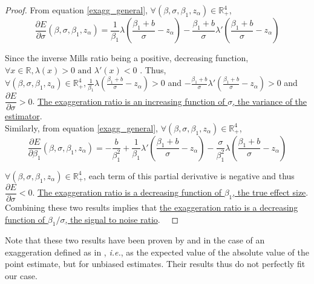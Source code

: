 \documentclass[a4paper, 11pt]{report}
\begin{document}
			\begin{proof}
				From equation \ref{exagg_general}, $\forall (\beta, \sigma, \beta_{1}, z_{\alpha}) \in \mathbb{R}_{+}^{4}$,
				~				
					\[
						\dfrac{\partial E}{\partial \sigma}(\beta, \sigma, \beta_{1}, z_{\alpha}) = 
							\dfrac{1}{\beta_{1}}\lambda\left( \dfrac{\beta_{1} + b}{\sigma}  - z_{\alpha} \right) - \dfrac{\beta_{1} + b}{\sigma}\lambda'\left( \dfrac{\beta_{1} + b}{\sigma} - z_{\alpha} \right)
					\]
					
				Since the inverse Mills ratio being a positive, decreasing function, $\forall x \in \mathbb{R}, \lambda(x) > 0 \text{ and } \lambda'(x) < 0$%
				. Thus, $\forall (\beta, \sigma, \beta_{1}, z_{\alpha}) \in \mathbb{R}_{+}^{4}, \frac{1}{\beta_{1}}\lambda\left( \frac{\beta_{1} + b}{\sigma} - z_{\alpha} \right) > 0$ and $- \frac{\beta_{1} + b}{\sigma}\lambda'\left( \frac{\beta_{1} + b}{\sigma} - z_{\alpha} \right) > 0$ and $\dfrac{\partial E}{\partial \sigma} > 0$. \ul{The exaggeration ratio is an increasing function of $\sigma$, the variance of the estimator}.\\
				
				Similarly, from equation \ref{exagg_general}, $\forall (\beta, \sigma, \beta_{1}, z_{\alpha}) \in \mathbb{R}_{+}^{4}$,
				~		
					\[
						\dfrac{\partial E}{\partial \beta_{1}}(\beta, \sigma, \beta_{1}, z_{\alpha}) = 
						- \dfrac{b}{\beta_{1}^{2}} 
						+ \dfrac{1}{\beta_{1}}\lambda'\left( \dfrac{\beta_{1} + b}{\sigma}  - z_{\alpha} \right) 
						- \dfrac{\sigma}{\beta_{1}^{2}}\lambda\left( \dfrac{\beta_{1} + b}{\sigma} - z_{\alpha} \right)
					\]
					
					$\forall (\beta, \sigma, \beta_{1}, z_{\alpha}) \in \mathbb{R}_{+}^{4}$, each term of this partial derivative is negative and thus $\dfrac{\partial E}{\partial \sigma} < 0$. \ul{The exaggeration ratio is a decreasing function of $\beta_{1}$, the true effect size}.\\
					
					Combining these two results implies that \ul{the exaggeration ratio is a decreasing function of $\beta_{1}/\sigma$, the signal to noise ratio}.
			~
			\end{proof}
				
				Note that these two results have been proven by \cite{lu_note_2019} and \cite{zwet_significance_2021} in the case of an exaggeration defined as in  \cite{gelman_beyond_2014}, \textit{i.e.}, as the expected value of the absolute value of the point estimate, but for unbiased estimates. Their results thus do not perfectly fit our case. \\
					
\end{document}
